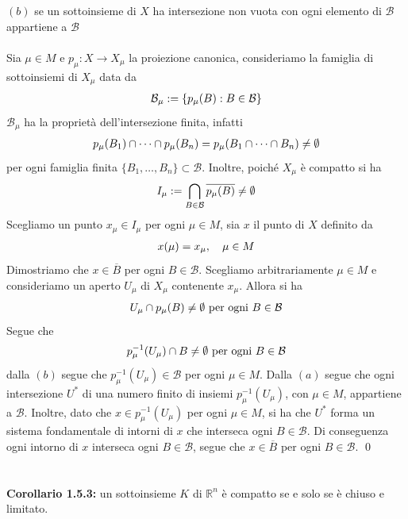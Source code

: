 \documentclass{article}
\begin{document}
$(b)$ se un sottoinsieme di $X$ ha intersezione non vuota con ogni elemento di $\mathcal{B}$ appartiene a $\mathcal{B}$ \\ \\
Sia $\mu \in M$ e $p_\mu : X \longrightarrow X_\mu$ la proiezione canonica, consideriamo la famiglia di sottoinsiemi di $X_\mu$ data da
\begin{gather}
    \mathcal{B}_\mu := \{ p_\mu(B) : B \in \mathcal{B} \} \notag
\end{gather}
$\mathcal{B}_\mu$ ha la proprietà dell'intersezione finita, infatti
\begin{gather}
    p_\mu(B_1) \cap \dots \cap p_\mu(B_n) = p_\mu(B_1 \cap \dots \cap B_n) \neq \emptyset \notag
\end{gather}
per ogni famiglia finita $\{ B_1, \dots, B_n \} \subset \mathcal{B}$. Inoltre, poiché $X_\mu$ è compatto si ha
\begin{gather}
    I_\mu := \bigcap_{B \in \mathcal{B}} \overline{p_\mu(B)} \neq \emptyset \notag
\end{gather}
Scegliamo un punto $x_\mu \in I_\mu$ per ogni $\mu \in M$, sia $x$ il punto di $X$ definito da
\begin{gather}
    x(\mu) = x_\mu, \quad \mu \in M \notag
\end{gather}
Dimostriamo che $x \in \overline{B}$ per ogni $B \in \mathcal{B}$. Scegliamo arbitrariamente $\mu \in M$ e consideriamo un aperto $U_\mu$ di $X_\mu$ contenente $x_\mu$. Allora si ha
\begin{gather}
    U_\mu \cap p_\mu(B) \neq \emptyset \text{ per ogni } B \in \mathcal{B} \notag
\end{gather}
Segue che
\begin{gather}
    p_\mu^{-1}(U_\mu) \cap B \neq \emptyset \text{ per ogni } B \in \mathcal{B} \notag
\end{gather}
dalla $(b)$ segue che $p_\mu^{-1}(U_\mu) \in \mathcal{B}$ per ogni $\mu \in M$. Dalla $(a)$ segue che ogni intersezione $U^*$ di una numero finito di insiemi $p_\mu^{-1}(U_\mu)$, con $\mu \in M$, appartiene a $\mathcal{B}$. Inoltre, dato che $x \in p_\mu^{-1}(U_\mu)$ per ogni $\mu \in M$, si ha che $U^*$ forma un sistema fondamentale di intorni di $x$ che interseca ogni $B \in \mathcal{B}$. Di conseguenza ogni intorno di $x$ interseca ogni $B \in \mathcal{B}$, segue che $x \in \overline{B}$ per ogni $B \in \mathcal{B}$. \qed \\ \\ \\
\textbf{Corollario 1.5.3:} un sottoinsieme $K$ di $\mathbb{R}^n$ è compatto se e solo se è chiuso e limitato. \\
\end{document}
